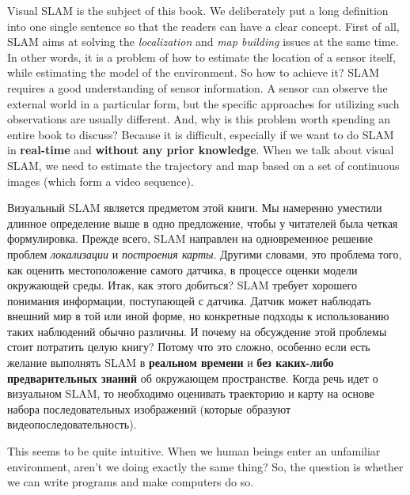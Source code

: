 \begin{English}
    Visual SLAM is the subject of this book. We deliberately put a long definition into one single sentence so that the readers can have a clear concept. First of all, SLAM aims at solving the \textit{localization} and \textit{map building} issues at the same time. In other words, it is a problem of how to estimate the location of a sensor itself, while estimating the model of the environment. So how to achieve it? SLAM requires a good understanding of sensor information. A sensor can observe the external world in a particular form, but the specific approaches for utilizing such observations are usually different. And, why is this problem worth spending an entire book to discuss? Because it is difficult, especially if we want to do SLAM in \textbf{real-time} and \textbf{without any prior knowledge}. When we talk about visual SLAM, we need to estimate the trajectory and map based on a set of continuous images (which form a video sequence).
\end{English}

\begin{Russian}
    Визуальный SLAM является предметом этой книги. Мы намеренно уместили длинное определение выше в одно предложение, чтобы у читателей была четкая формулировка. Прежде всего, SLAM направлен на одновременное решение проблем \textit{локализации} и \textit{построения карты}. Другими словами, это проблема того, как оценить местоположение самого датчика, в процессе оценки модели окружающей среды. Итак, как этого добиться? SLAM требует хорошего понимания информации, поступающей с датчика. Датчик может наблюдать внешний мир в той или иной форме, но конкретные подходы к использованию таких наблюдений обычно различны. И почему на обсуждение этой проблемы стоит потратить целую книгу? Потому что это сложно, особенно если есть желание выполнять SLAM в \textbf{реальном времени} и \textbf{без каких-либо предварительных знаний} об окружающем пространстве. Когда речь идет о визуальном SLAM, то необходимо оценивать траекторию и карту на основе набора последовательных изображений (которые образуют видеопоследовательность).
\end{Russian}

\begin{English}
    This seems to be quite intuitive. When we human beings enter an unfamiliar environment, aren't we doing exactly the same thing? So, the question is whether we can write programs and make computers do so.
\end{English}

